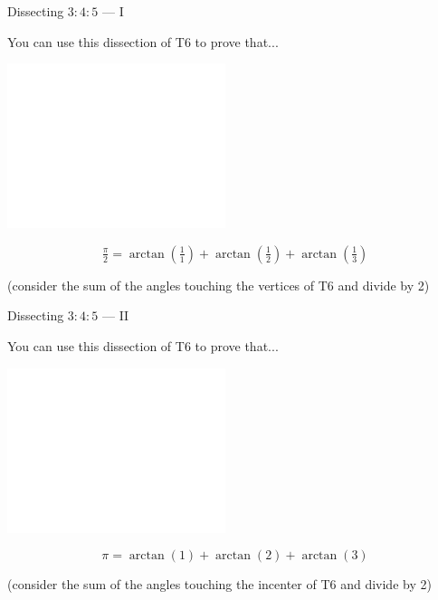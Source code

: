 \documentclass[14pt]{beamer}
\begin{document}
    \begin{frame}{Dissecting $3\!\!:\!\!4\!\!:\!\!5$ --- I}
        \begin{center}
            You can use this dissection of T6 to prove that...

            \bigskip\bigskip

            \includegraphics[height=18ex]{figures/figure006c.pdf}\vspace{-1em}

            $$\tfrac{\pi}{2} = \arctan{\!\left(\tfrac{1}{1}\right)} + \arctan{\!\left(\tfrac{1}{2}\right)} + \arctan{\!\left(\tfrac{1}{3}\right)}$$

            {\footnotesize(consider the sum of the angles touching the vertices of T6 and divide by 2)}
        \end{center}
    \end{frame}


    \begin{frame}{Dissecting $3\!\!:\!\!4\!\!:\!\!5$ --- II}
        \begin{center}
            You can use this dissection of T6 to prove that...

            \bigskip\bigskip

            \includegraphics[height=18ex]{figures/figure006c.pdf}\vspace{-1em}

            $$\pi = \arctan{\!\left(1\right)} + \arctan{\!\left(2\right)} + \arctan{\!\left(3\right)}$$

            {\footnotesize(consider the sum of the angles touching the incenter of T6 and divide by 2)}
        \end{center}
    \end{frame}
\end{document}
